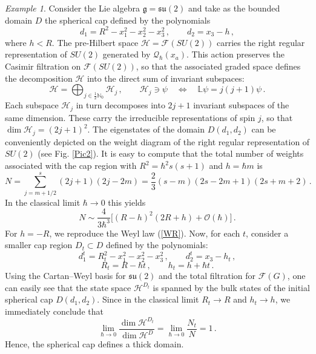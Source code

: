 \documentclass[12pt,a4paper]{article}
\numberwithin{equation}{section}
\theoremstyle{theorem}
\theoremstyle{remark}
\newtheorem{example}[equation]{Example}
\newcommand{\hh}{\mathcal{H}}
\newcommand{\fg}{\mathcal{F}(G)}
\newcommand{\qq}{\mathcal{Q}_{\hbar}}
\begin{document}
\begin{example}Consider the Lie algebra $\mathfrak{g}=\mathfrak{su}(2)$ and take as the bounded domain  $D$ the spherical  cap defined by the polynomials
\begin{equation}
   d_1=R^2-x^2_1-x^2_2-x^2_3\,,\qquad d_2=x_3-h\,,
\end{equation}
where $h<R$. The pre-Hilbert space $\hh=\mathcal{F}(SU(2))$ carries the right regular representation of $SU(2)$ generated by $\qq(x_a)$. This action preserves the Casimir filtration on $\mathcal{F}(SU(2))$, so that the associated graded space defines the decomposition $\hh$ into the direct sum of invariant subspaces:
\begin{equation}
    \hh=\bigoplus_{j\in \frac12\mathbb{N}_0}\hh_j\,,\qquad    \hh_j \ni \psi \quad \Longleftrightarrow\quad \mathbb{L}\psi=j(j+1)\psi\,.\end{equation}
Each subspace $\hh_j$ in turn decomposes into $2j+1$ invariant subspaces of the same dimension. These carry the irreducible representations of spin $j$, so that $\dim\hh_j=(2j+1)^2$. The eigenstates of the domain  $D(d_1, d_2)$ can be conveniently depicted on the weight diagram of the right regular representation of $SU(2)$ (see  Fig. \ref{Pic2}).  It is easy to compute that the total number of weights associated with the cap region with $R^2=\hbar^2s(s+1)$ and $h=\hbar m$ is 
\begin{equation}
    N=\sum_{j=m+1/2}^s (2j+1)(2j-2m)= \frac{2}{3}{(s-m)(2s-2m+1)\left(2s + m +2\right)}\,.
\end{equation}
In the classical limit $\hbar\rightarrow 0$ this yields
\begin{equation}
    N\sim \frac4{3\hbar^3}\big[{(R-h)^2(2R+h)}+\mathcal{O}(\hbar)\big]\,.
\end{equation}
For $h=-R$, we reproduce the Weyl law (\ref{WR}). Now, for each $t$, consider a smaller cap region $D_t\subset D$ defined by the polynomials: 
\begin{equation}
    d^t_1=R_t^2-x_1^2-x_2^2-x_3^2\,,\qquad d^t_2=x_3-h_t\,,
\end{equation}
$$R_t=R-\hbar t\,,\qquad h_t=h+\hbar t\,.$$ Using the Cartan--Weyl basis for $\mathfrak{su}(2)$ and the total filtration for $\fg$,  one can easily see that the state space 
$\hh^{D_t}$ is spanned by the bulk states of the initial spherical cap $D(d_1,d_2)$. Since in the classical limit $R_t\rightarrow R$ and $h_t\rightarrow h$, we immediately conclude that 
\begin{equation}
    \lim_{\hbar\rightarrow 0}\frac{\dim \hh^{D_t}}{\dim \hh^D}=\lim_{\hbar\rightarrow 0}\frac{N_t}{N}=1\,.
\end{equation}
Hence, the spherical cap defines a thick domain. 

\end{example}
\end{document}
